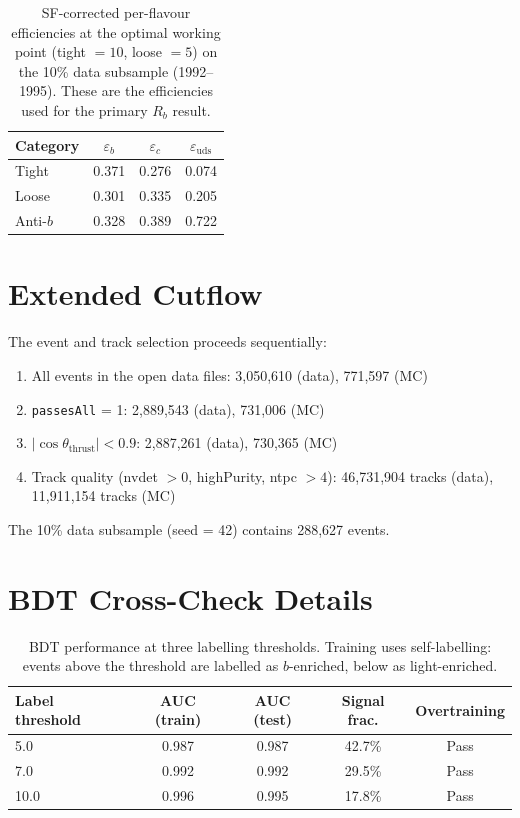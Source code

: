 \documentclass[11pt,a4paper]{article}
\begin{document}
\begin{table}[htbp]
\centering
\caption{SF-corrected per-flavour efficiencies at the optimal
working point (tight $= 10$, loose $= 5$) on the 10\% data
subsample (1992--1995). These are the efficiencies used for the
primary $R_b$ result.}
\label{tbl:efficiencies_sf}
\begin{tabular}{lccc}
\toprule
Category & $\varepsilon_b$ & $\varepsilon_c$ &
  $\varepsilon_\text{uds}$ \\
\midrule
Tight & 0.371 & 0.276 & 0.074 \\
Loose & 0.301 & 0.335 & 0.205 \\
Anti-$b$ & 0.328 & 0.389 & 0.722 \\
\bottomrule
\end{tabular}
\end{table}

\section{Extended Cutflow}
\label{app:cutflow}

The event and track selection proceeds sequentially:
\begin{enumerate}
\item All events in the open data files: 3,050,610 (data),
  771,597 (MC)
\item \texttt{passesAll} = 1: 2,889,543 (data), 731,006 (MC)
\item $|\cos\theta_\text{thrust}| < 0.9$: 2,887,261 (data),
  730,365 (MC)
\item Track quality (nvdet $> 0$, highPurity, ntpc $> 4$):
  46,731,904 tracks (data), 11,911,154 tracks (MC)
\end{enumerate}

The 10\% data subsample (seed = 42) contains 288,627 events.

\section{BDT Cross-Check Details}
\label{app:bdt}

\begin{table}[htbp]
\centering
\caption{BDT performance at three labelling thresholds.
Training uses self-labelling: events above the threshold are
labelled as $b$-enriched, below as light-enriched.}
\label{tbl:bdt}
\begin{tabular}{lcccc}
\toprule
Label threshold & AUC (train) & AUC (test) & Signal frac. &
Overtraining \\
\midrule
5.0  & 0.987 & 0.987 & 42.7\% & Pass \\
7.0  & 0.992 & 0.992 & 29.5\% & Pass \\
10.0 & 0.996 & 0.995 & 17.8\% & Pass \\
\bottomrule
\end{tabular}
\end{table}
\end{document}
